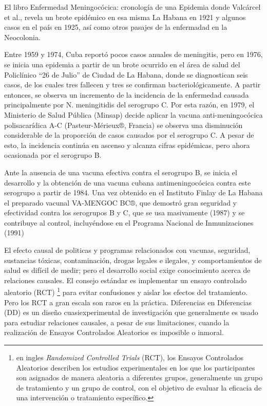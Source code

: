\documentclass[a4paper,10pt,twocolumn]{article}
\begin{document}
		El libro Enfermedad Meningocócica: cronología de una Epidemia donde Valcárcel et al., revela un brote epidémico en esa misma La Habana en 1921 y algunos casos en el país en 1925, así como otros pasajes de la enfermadad en la Neocolonia.  \cite{valcarcel}
		
		Entre 1959 y 1974, Cuba reportó pocos casos anuales de meningitis, pero en 1976, se inicia una epidemia a partir de un brote ocurrido en el área de salud del Policlínico “26 de Julio” de Ciudad de La Habana, donde se diagnostican seis casos, de los cuales tres fallecen y tres se confirman bacteriológicamente. A partir entonces, se observa un incremento de la incidencia de la enfermedad causada principalmente por N. meningitidis del serogrupo C. Por esta razón, en 1979, el Ministerio de Salud Pública (Minsap) decide aplicar la vacuna anti-meningocócica polisacarídica A-C (Pasteur-Mérieux®, Francia) se observa una disminución considerable de la proporción de casos causados por el serogrupo C. A pesar de esto, la incidencia continúa en ascenso y alcanza cifras epidémicas, pero ahora ocasionada por el serogrupo B.  \cite{batlle}
		
		Ante la ausencia de una vacuna efectiva contra el serogrupo B, se inicia el desarrollo y la obtención de una vacuna cubana antimeningocócica contra este serogrupo a partir de 1984. Una vez obtenido en el Instituto Finlay de La Habana el preparado vacunal VA-MENGOC BC®, que demostró gran seguridad y efectividad contra los serogrupos B y C, que se usa masivamente (1987) y se contribuye al control, incluyéndose en el Programa Nacional de Inmunizaciones (1991) \cite{batlle}
		
		El efecto causal de politicas y programas relacionados con vacunas, seguridad, sustancias tóxicas, contaminación, drogas legales e ilegales, y comportamientos de salud es difícil de medir; pero el desarrollo social exige conocimiento acerca de relaciones causales. El consejo estándar es implementar un ensayo controlado aleatorio (RCT)  \footnote{ en ingles \emph{Randomized Controlled Trials} (RCT), los Ensayos Controlados Aleatorios describen los estudios experimentales en los que los participantes son asignados de manera aleatoria a diferentes grupos, generalmente un grupo de tratamiento y un grupo de control, con el objetivo de evaluar la eficacia de una intervención o tratamiento específico.} para evitar confusiones y aislar los efectos del tratamiento. Pero los RCT a gran escala son raros en la práctica. Diferencias en Diferencias (DD) es un diseño cuasiexperimental de investigación que generalmente es usado para estudiar relaciones causales, a pesar de sus limitaciones, cuando la realización de Ensayos Controlados Aleatorios es imposible o inmoral. \cite{wing}
		
\end{document}

